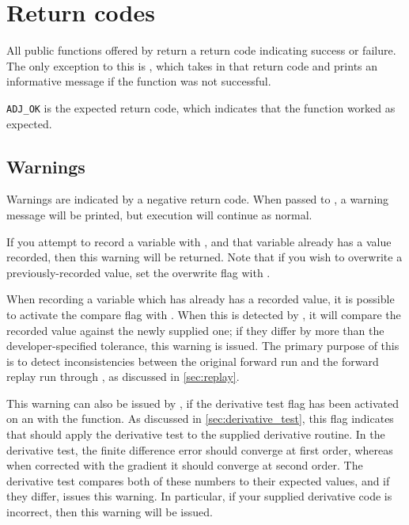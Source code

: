 \chapter{Return codes}

All public functions offered by \libadjoint return a return code indicating
success or failure. The only exception to this is , which
takes in that return code and prints an informative message if the function was
not successful.

\texttt{ADJ_OK} is the expected return code, which indicates that the function
worked as expected.

\section{Warnings}
Warnings are indicated by a negative return code. When passed to ,
a warning message will be printed, but execution will continue as normal.

If you attempt to record a variable with , and that variable
already has a value recorded, then this warning will be returned.
Note that if you wish to overwrite a previously-recorded value, set the overwrite flag
with .

When recording a variable which has already has a recorded value, it is possible to activate the
compare flag with . When this is detected by ,
it will compare the recorded value against the newly supplied one; if they differ by more than
the developer-specified tolerance, this warning is issued. The primary purpose of this is to detect
inconsistencies between the original forward run and the forward replay run through \libadjoint,
as discussed in \autoref{sec:replay}.

This warning can also be issued by ,
if the derivative test flag has been activated on an  with the  function.
As discussed in \autoref{sec:derivative_test}, this flag indicates that \libadjoint should apply the derivative
test to the supplied derivative routine. In the derivative test, the finite difference error should converge
at first order, whereas when corrected with the gradient it should converge at second order. The derivative test
compares both of these numbers to their expected values, and if they differ, issues this warning.
In particular, if your supplied derivative code is incorrect, then this warning will be issued.


